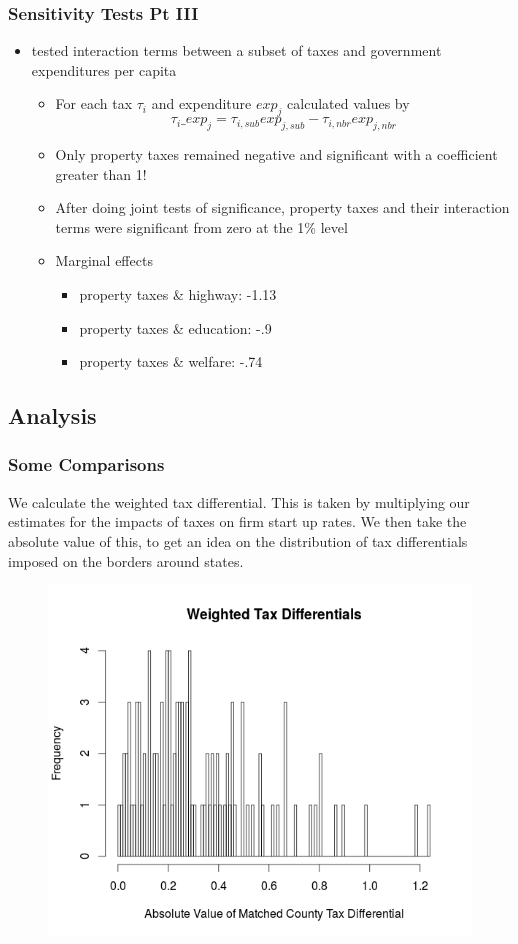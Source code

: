 \documentclass{beamer}
\begin{document}
\begin{frame}
\frametitle{Sensitivity Tests Pt III}
\begin{itemize}
\item tested interaction terms between a subset of taxes and government expenditures per capita
\begin{itemize}
\item For each tax $\tau_{i}$ and expenditure $exp_{j}$ calculated values by
\begin{equation}
\tau_{i}\_exp_{j} = \tau_{i,sub}exp_{j,sub}-\tau_{i,nbr}exp_{j,nbr}
\end{equation}
\item Only property taxes remained negative and significant with a coefficient greater than 1!
\item After doing joint tests of significance, property taxes and their interaction terms were significant from zero at the 1\% level
\item Marginal effects
\begin{itemize}
\item property taxes \& highway: -1.13
\item property taxes \& education: -.9
\item property taxes \& welfare: -.74
\end{itemize}
\end{itemize}
\end{itemize}
\end{frame}

\begin{frame}
\section{Analysis}
\frametitle{Some Comparisons}
We calculate the weighted tax differential. This is taken by multiplying our estimates for the impacts of taxes on firm start up rates. We then take the absolute value of this, to get an idea on the distribution of tax differentials imposed on the borders around states.
\begin{figure}
\centering
\includegraphics[scale=0.35]{taxdiff}
\end{figure}
\end{frame}
\end{document}
